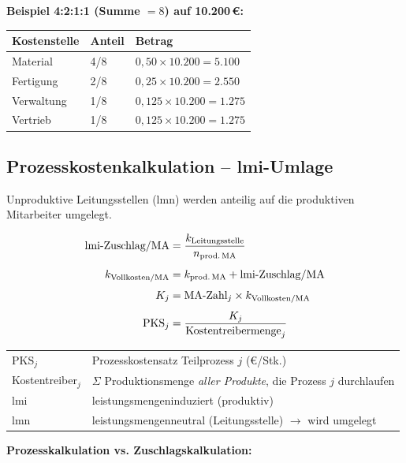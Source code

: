 \documentclass[10pt,a4paper]{article}
\begin{document}
\begin{multicols}{2}
\textbf{Beispiel 4:2:1:1 (Summe $= 8$) auf 10.200\,€:}

\begin{tabular}{|L{2.3cm}|L{1.2cm}|L{2.7cm}|}
\hline
{}
Kostenstelle & Anteil & Betrag \\
\hline
Material & 4/8 & $0{,}50 \times 10.200 = 5.100$ \\
Fertigung & 2/8 & $0{,}25 \times 10.200 = 2.550$ \\
Verwaltung & 1/8 & $0{,}125 \times 10.200 = 1.275$ \\
Vertrieb & 1/8 & $0{,}125 \times 10.200 = 1.275$ \\
\hline
\end{tabular}

\columnbreak

\subsection{Prozesskostenkalkulation -- lmi-Umlage}

Unproduktive Leitungsstellen (lmn) werden anteilig auf die produktiven Mitarbeiter umgelegt.

\begin{formelbox}
\renewcommand{\arraystretch}{1.4}
\begin{align*}
\text{lmi-Zuschlag/MA} &= \frac{k_{\text{Leitungsstelle}}}{n_{\text{prod.\,MA}}} \\[4pt]
k_{\text{Vollkosten/MA}} &= k_{\text{prod.\,MA}} + \text{lmi-Zuschlag/MA} \\[4pt]
K_j &= \text{MA-Zahl}_j \times k_{\text{Vollkosten/MA}} \\[4pt]
\text{PKS}_j &= \frac{K_j}{\text{Kostentreibermenge}_j}
\end{align*}
\end{formelbox}

\begin{tabular}{|L{2.5cm}|L{4.5cm}|}
\hline
{}
PKS$_j$ & Prozesskostensatz Teilprozess $j$ (€/Stk.) \\
Kostentreiber$_j$ & $\Sigma$ Produktionsmenge \textit{aller Produkte}, die Prozess $j$ durchlaufen \\
lmi & leistungsmengeninduziert (produktiv) \\
lmn & leistungsmengenneutral (Leitungsstelle) $\to$ wird umgelegt \\
\hline
\end{tabular}

\vspace{4pt}
\textbf{Prozesskalkulation vs. Zuschlagskalkulation:}


\end{multicols}
\end{document}
